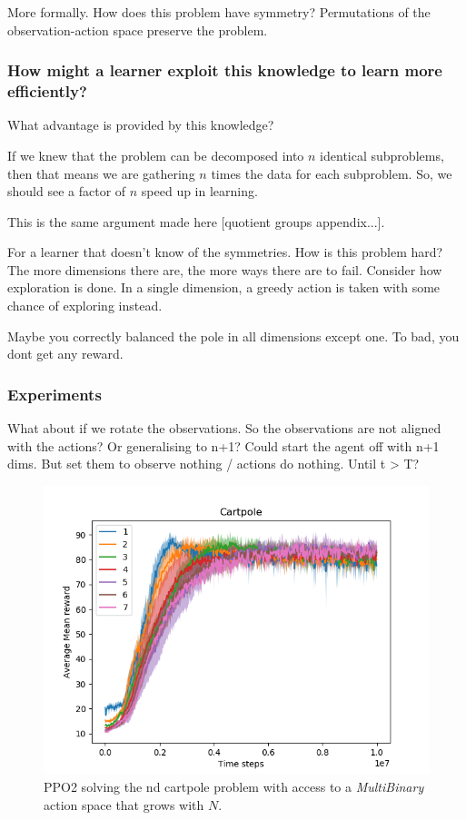 More formally. How does this problem have symmetry?
Permutations of the observation-action space preserve the problem.

\subsubsection{How might a learner exploit this knowledge to learn more efficiently?}

What advantage is provided by this knowledge?

If we knew that the problem can be decomposed into $n$ identical subproblems,
then that means we are gathering $n$ times the data for each subproblem.
So, we should see a factor of $n$ speed up in learning.

This is the same argument made here [quotient groups appendix...].

For a learner that doesn't know of the symmetries. How is this problem hard?
The more dimensions there are, the more ways there are to fail.
Consider how exploration is done. In a single dimension, a greedy action is
taken with some chance of exploring instead.

Maybe you correctly balanced the pole in all dimensions except one. To bad, you dont get any reward.



\subsubsection{Experiments}

What about if we rotate the observations. So the observations are not aligned with the actions?
Or generalising to n+1? Could start the agent off with n+1 dims. But set them to observe nothing / actions do nothing. Until t > T?

\begin{figure}
  \centering
  \includegraphics[width=1\textwidth,height=0.5\textheight]{../../pictures/figures/multibinary-nd-cart.png}
  \caption{PPO2 solving the nd cartpole problem with access to a \textit{MultiBinary} action space that grows with $N$.}
\end{figure}

